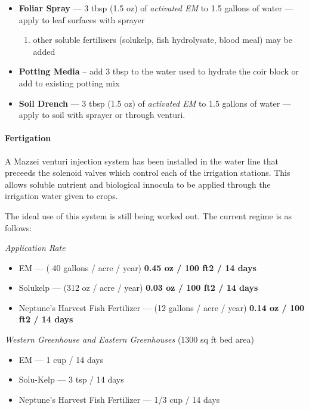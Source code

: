 \begin{itemize}
\itemsep1pt\parskip0pt
\item
  \textbf{Foliar Spray} --- 3 tbsp (1.5 oz) of \emph{activated EM} to
  1.5 gallons of water --- apply to leaf surfaces with sprayer

  \begin{enumerate}
  \def\labelenumi{\arabic{enumi}.}
  \itemsep1pt\parskip0pt
  \item
    other soluble fertilisers (solukelp, fish hydrolysate, blood meal)
    may be added
  \end{enumerate}
\item
  \textbf{Potting Media} -- add 3 tbsp to the water used to hydrate the
  coir block or add to existing potting mix
\item
  \textbf{Soil Drench} --- 3 tbsp (1.5 oz) of \emph{activated EM} to 1.5
  gallons of water --- apply to soil with sprayer or through venturi.
\end{itemize}

\paragraph{Fertigation}\label{fertigation}

A Mazzei venturi injection system has been installed in the water line
that preceeds the solenoid valves which control each of the irrigation
stations. This allows soluble nutrient and biological innocula to be
applied through the irrigation water given to crops.

The ideal use of this system is still being worked out. The current
regime is as follows:

\emph{Application Rate}

\begin{itemize}
\itemsep1pt\parskip0pt
\item
  EM --- ( 40 gallons / acre / year) \textbf{0.45 oz / 100 ft2 / 14
  days}
\item
  Solukelp --- (312 oz / acre / year) \textbf{0.03 oz / 100 ft2 / 14
  days}
\item
  Neptune's Harvest Fish Fertilizer --- (12 gallons / acre / year)
  \textbf{0.14 oz / 100 ft2 / 14 days}
\end{itemize}

\emph{Western Greenhouse and Eastern Greenhouses} (1300 sq ft bed area)

\begin{itemize}
\itemsep1pt\parskip0pt
\item
  EM --- 1 cup / 14 days
\item
  Solu-Kelp --- 3 tsp / 14 days
\item
  Neptune's Harvest Fish Fertilizer --- 1/3 cup / 14 days
\end{itemize}


